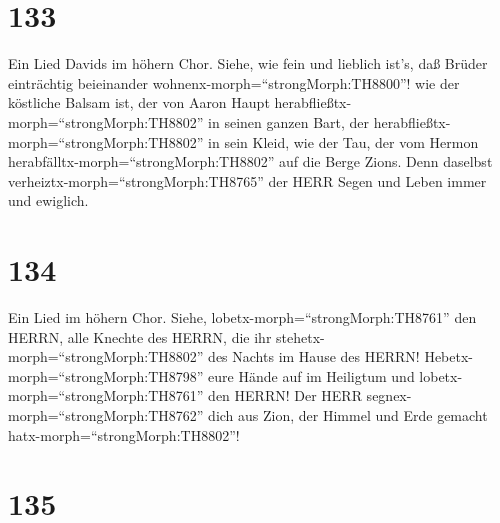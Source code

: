 \hypertarget{section-132}{%
\section{133}\label{section-132}}

 Ein Lied Davids im höhern Chor. Siehe, wie fein und
lieblich ist's, daß Brüder einträchtig beieinander
wohnenx-morph=``strongMorph:TH8800''!  wie der köstliche
Balsam ist, der von Aaron Haupt
herabfließtx-morph=``strongMorph:TH8802'' in seinen ganzen Bart, der
herabfließtx-morph=``strongMorph:TH8802'' in sein Kleid, 
wie der Tau, der vom Hermon herabfälltx-morph=``strongMorph:TH8802'' auf
die Berge Zions. Denn daselbst verheiztx-morph=``strongMorph:TH8765''
der HERR Segen und Leben immer und ewiglich.

\hypertarget{section-133}{%
\section{134}\label{section-133}}

 Ein Lied im höhern Chor. Siehe,
lobetx-morph=``strongMorph:TH8761'' den HERRN, alle Knechte des HERRN,
die ihr stehetx-morph=``strongMorph:TH8802'' des Nachts im Hause des
HERRN!  Hebetx-morph=``strongMorph:TH8798'' eure Hände auf
im Heiligtum und lobetx-morph=``strongMorph:TH8761'' den HERRN!
 Der HERR segnex-morph=``strongMorph:TH8762'' dich aus Zion,
der Himmel und Erde gemacht hatx-morph=``strongMorph:TH8802''!

\hypertarget{section-134}{%
\section{135}\label{section-134}}


